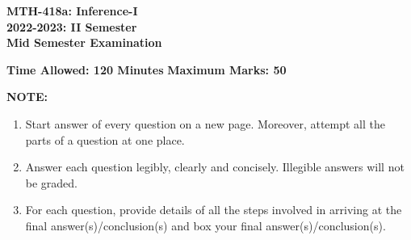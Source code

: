 \documentclass{article}
\begin{document}
\begin{center}
    \textbf{MTH-418a: Inference-I} \\
    \textbf{2022-2023: II Semester} \\
    \textbf{Mid Semester Examination}
\end{center}

\noindent \textbf{Time Allowed: 120 Minutes} \hfill \textbf{Maximum Marks: 50}

\vspace{1em}

\noindent \textbf{NOTE:} 
\begin{enumerate}
    \item Start answer of every question on a new page. Moreover, attempt all the parts of a question at one place.
    \item Answer each question legibly, clearly and concisely. Illegible answers will not be graded.
    \item For each question, provide details of all the steps involved in arriving at the final answer(s)/conclusion(s) and box your final answer(s)/conclusion(s).
\end{enumerate}

\hr
\end{document}
